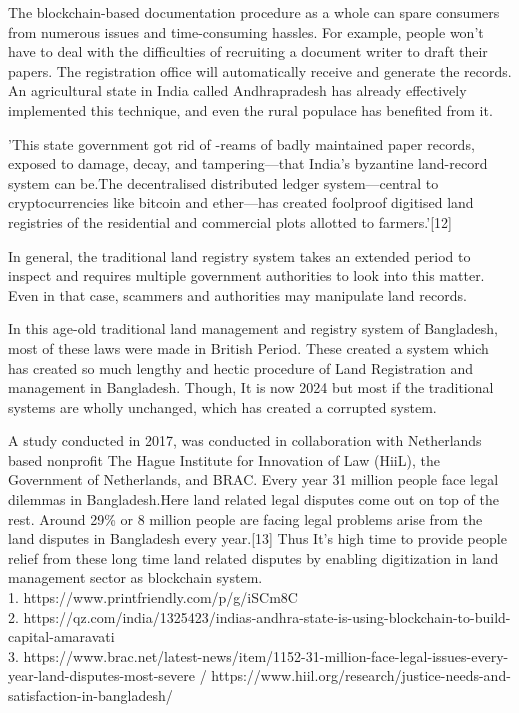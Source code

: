\documentclass[conference]{IEEEtran}
\begin{document}
The blockchain-based documentation procedure as a whole can spare consumers from numerous issues and time-consuming hassles. For example, people won't have to deal with the difficulties of recruiting a document writer to draft their papers. The registration office will automatically receive and generate the records. An agricultural state in India called Andhrapradesh has already effectively implemented this technique, and even the rural populace has benefited from it.

'This state government got rid of -reams of badly maintained paper records, exposed to damage, decay, and tampering—that India's byzantine land-record system can be.The decentralised distributed ledger system—central to cryptocurrencies like bitcoin and ether—has created foolproof digitised land registries of the residential and commercial plots allotted to farmers.'[12]

In general, the traditional land registry system takes an extended period to inspect and requires multiple government authorities to look into this matter. Even in that case, scammers and authorities may manipulate land records.


In this age-old traditional land management and registry system of Bangladesh, most of these laws were made in British Period. These created a system which has created so much lengthy and hectic procedure of Land Registration and management in Bangladesh. Though, It is now 2024 but most if the traditional systems are wholly  unchanged, which has created a corrupted system.

 A study conducted in 2017, was conducted in collaboration with Netherlands based nonprofit The Hague Institute for Innovation of Law (HiiL), the Government of Netherlands, and BRAC. Every year  31 million people face legal dilemmas in Bangladesh.Here land related legal disputes come out on top of the rest. Around 29\% or 8 million people are facing legal problems arise from the land disputes in Bangladesh every year.[13] Thus It's high time to provide people relief from these long time land related disputes by enabling  digitization in land management sector as blockchain system. \\


 1. https://www.printfriendly.com/p/g/iSCm8C\\
 2. https://qz.com/india/1325423/indias-andhra-state-is-using-blockchain-to-build-capital-amaravati\\
 3. https://www.brac.net/latest-news/item/1152-31-million-face-legal-issues-every-year-land-disputes-most-severe / https://www.hiil.org/research/justice-needs-and-satisfaction-in-bangladesh/
\end{document}
